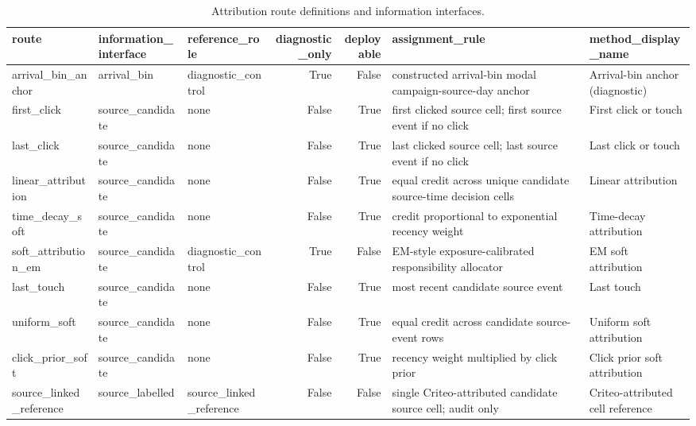 \begin{table}
\caption{Attribution route definitions and information interfaces.}
\label{tab:app_exp2_attribution_routes}
\begin{tabular}{lllrrll}
\toprule
route & information\_interface & reference\_role & diagnostic\_only & deployable & assignment\_rule & method\_display\_name \\
\midrule
arrival\_bin\_anchor & arrival\_bin & diagnostic\_control & True & False & constructed arrival-bin modal campaign-source-day anchor & Arrival-bin anchor (diagnostic) \\
first\_click & source\_candidate & none & False & True & first clicked source cell; first source event if no click & First click or touch \\
last\_click & source\_candidate & none & False & True & last clicked source cell; last source event if no click & Last click or touch \\
linear\_attribution & source\_candidate & none & False & True & equal credit across unique candidate source-time decision cells & Linear attribution \\
time\_decay\_soft & source\_candidate & none & False & True & credit proportional to exponential recency weight & Time-decay attribution \\
soft\_attribution\_em & source\_candidate & diagnostic\_control & True & False & EM-style exposure-calibrated responsibility allocator & EM soft attribution \\
last\_touch & source\_candidate & none & False & True & most recent candidate source event & Last touch \\
uniform\_soft & source\_candidate & none & False & True & equal credit across candidate source-event rows & Uniform soft attribution \\
click\_prior\_soft & source\_candidate & none & False & True & recency weight multiplied by click prior & Click prior soft attribution \\
source\_linked\_reference & source\_labelled & source\_linked\_reference & False & False & single Criteo-attributed candidate source cell; audit only & Criteo-attributed cell reference \\
\bottomrule
\end{tabular}
\end{table}

